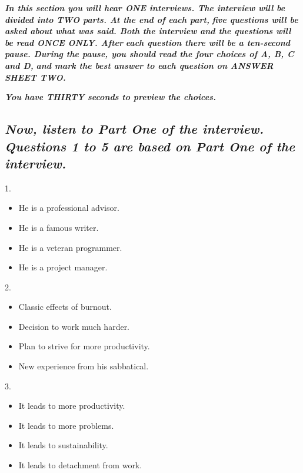 \documentclass[UTF8,11pt]{ctexart}
\begin{document}
\textbf{\textit{In this section you will hear ONE interviews. The interview will be divided into TWO parts. At the end of each part,}} \textbf{\textit{five questions will be asked about what was said. Both the interview and the questions will be read ONCE ONLY. After}} \textbf{\textit{each question there will be a ten-second pause. During the pause, you should read the four choices of A, B, C and D,}} \textbf{\textit{and mark the best answer to each question on ANSWER SHEET TWO.}}


\textbf{\textit{You have THIRTY seconds to preview the choices.}}


\subsection*{\textbf{\textit{Now, listen to Part One of the interview. Questions 1 to 5 are based on Part One of the interview.}}}


1.


\begin{itemize}[leftmargin=2em,itemsep=.2em,topsep=.4em]\item[A.] He is a professional advisor.
\item[B.] He is a famous writer.
\item[C.] He is a veteran programmer.
\item[D.] He is a project manager.
\end{itemize}

2.


\begin{itemize}[leftmargin=2em,itemsep=.2em,topsep=.4em]\item[A.] Classic effects of burnout.
\item[B.] Decision to work much harder.
\item[C.] Plan to strive for more productivity.
\item[D.] New experience from his sabbatical.
\end{itemize}

3.


\begin{itemize}[leftmargin=2em,itemsep=.2em,topsep=.4em]\item[A.] It leads to more productivity.
\item[B.] It leads to more problems.
\item[C.] It leads to sustainability.
\item[D.] It leads to detachment from work.
\end{itemize}
\end{document}
